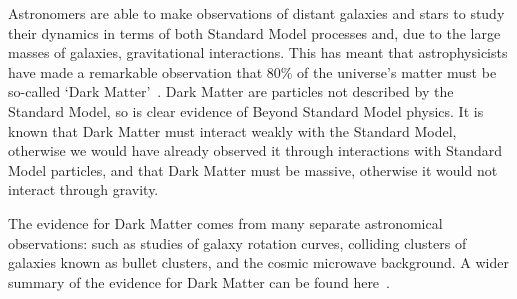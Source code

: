 
Astronomers are able to make observations of distant galaxies and stars
to study their dynamics in terms of both Standard Model processes
and, due to the large masses of galaxies, gravitational interactions.
This has meant that astrophysicists have made a remarkable observation that
80\% of the universe's matter must be so-called `Dark Matter'~\cite{theo-bsm_dm_peskin}.
Dark Matter are particles not described by the Standard Model,
so is clear evidence of Beyond Standard Model physics.
It is known that Dark Matter must interact weakly with the Standard Model,
otherwise we would have already observed it through interactions with Standard Model particles,
and that Dark Matter must be massive, otherwise it would not interact through gravity.

The evidence for Dark Matter comes from many separate astronomical observations:
such as studies of
galaxy rotation curves,
colliding clusters of galaxies known as bullet clusters,
and the cosmic microwave background.
A wider summary of the evidence for Dark Matter can be found here~\cite{theo-bsm_dm_evidence}.

